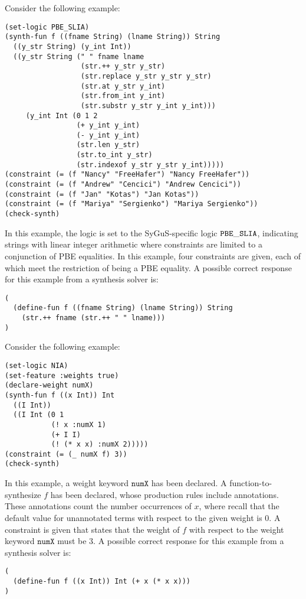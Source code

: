 \documentclass[english,a4paper,10pt]{article}
\begin{document}
\begin{example}
Consider the following example:
\begin{lstlisting}[language=SyGuS]
(set-logic PBE_SLIA)
(synth-fun f ((fname String) (lname String)) String
  ((y_str String) (y_int Int))
  ((y_str String (" " fname lname
                  (str.++ y_str y_str)
                  (str.replace y_str y_str y_str)
                  (str.at y_str y_int)
                  (str.from_int y_int)
                  (str.substr y_str y_int y_int)))
     (y_int Int (0 1 2
                 (+ y_int y_int)
                 (- y_int y_int)
                 (str.len y_str)
                 (str.to_int y_str)
                 (str.indexof y_str y_str y_int)))))
(constraint (= (f "Nancy" "FreeHafer") "Nancy FreeHafer"))
(constraint (= (f "Andrew" "Cencici") "Andrew Cencici"))
(constraint (= (f "Jan" "Kotas") "Jan Kotas"))
(constraint (= (f "Mariya" "Sergienko") "Mariya Sergienko"))
(check-synth)
\end{lstlisting}
In this example, the logic is set to the SyGuS-specific logic
${\tt PBE\_SLIA}$, indicating strings with linear integer arithmetic
where constraints are limited to a conjunction of PBE equalities.
In this example, four constraints are given, each of which meet the
restriction of being a PBE equality.
A possible correct response for this example from a synthesis solver is:
\begin{lstlisting}[language=SyGuS]
(
  (define-fun f ((fname String) (lname String)) String
    (str.++ fname (str.++ " " lname)))
)
\end{lstlisting}
\end{example}

\begin{example}[Weights]
Consider the following example:
\begin{lstlisting}[language=SyGuS]
(set-logic NIA)
(set-feature :weights true)
(declare-weight numX)
(synth-fun f ((x Int)) Int
  ((I Int))
  ((I Int (0 1
           (! x :numX 1)
           (+ I I)
           (! (* x x) :numX 2)))))
(constraint (= (_ numX f) 3))
(check-synth)
\end{lstlisting}
In this example, a weight keyword $\texttt{numX}$ has been declared.
A function-to-synthesize $f$ has been declared, whose production
rules include annotations.
These annotations count the number occurrences of $x$, where recall
that the default value for unannotated terms with respect to the given weight is $0$.
A constraint is given that states that the weight of $f$ with respect to
the weight keyword $\texttt{numX}$ must be $3$.
A possible correct response for this example from a synthesis solver is:
\begin{lstlisting}[language=SyGuS]
(
  (define-fun f ((x Int)) Int (+ x (* x x)))
)
\end{lstlisting}
\end{example}
\end{document}
